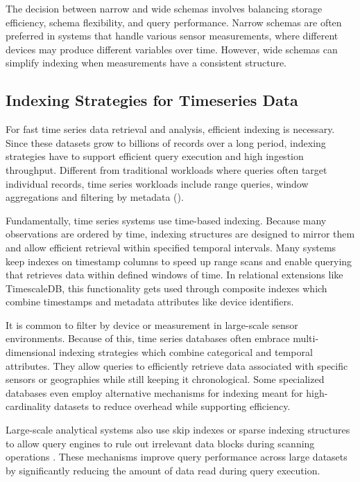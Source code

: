 The decision between narrow and wide schemas involves balancing storage efficiency, schema flexibility, and query performance. Narrow schemas are often preferred in systems that handle various sensor measurements, where different devices may produce different variables over time. However, wide schemas can simplify indexing when measurements have a consistent structure.



\subsection{Indexing Strategies for Timeseries Data}
For fast time series data retrieval and analysis, efficient indexing is necessary. Since these datasets grow to billions of records over a long period, indexing strategies have to support efficient query execution and high ingestion throughput. Different from traditional workloads where queries often target individual records, time series workloads include range queries, window aggregations and filtering by metadata (\citet{Jensen2017}).

Fundamentally, time series systems use time-based indexing. Because many observations are ordered by time, indexing structures are designed to mirror them and allow efficient retrieval within specified temporal intervals. Many systems keep indexes on timestamp columns to speed up range scans and enable querying that retrieves data within defined windows of time. In relational extensions like TimescaleDB, this functionality gets used through composite indexes which combine timestamps and metadata attributes like device identifiers. 

It is common to filter by device or measurement in large-scale sensor environments. Because of this, time series databases often embrace multi-dimensional indexing strategies which combine categorical and temporal attributes. They allow queries to efficiently retrieve data associated with specific sensors or geographies while still keeping it chronological. Some specialized databases even employ alternative mechanisms for indexing meant for high-cardinality datasets to reduce overhead while supporting efficiency. 

Large-scale analytical systems also use skip indexes or sparse indexing structures to allow query engines to rule out irrelevant data blocks during scanning operations \cite{tashma2020extensibledataskipping}. These mechanisms improve query performance across large datasets by significantly reducing the amount of data read during query execution.


